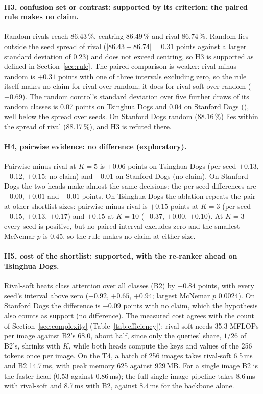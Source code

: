 \documentclass[11pt,a4paper]{article}
\theoremstyle{plain}
\newcommand{\fn}[1]{\texttt{\detokenize{#1}}}
\begin{document}
\paragraph{H3, confusion set or contrast: supported by its criterion; the paired rule makes no claim.}
Random rivals reach 86.43\,\%, centring 86.49\,\% and rival 86.74\,\%. Random lies outside the seed spread of rival
($|86.43-86.74|=0.31$ points against a larger standard deviation of 0.23) and does not exceed centring, so H3 is
supported as defined in Section~\ref{sec:rule}. The paired comparison is weaker: rival minus random is $+0.31$ points
with one of three intervals excluding zero, so the rule itself makes no claim for rival over random; it does for
rival-soft over random ($+0.69$). The random control's standard deviation over five further draws of its random
classes is 0.07 points on Tsinghua Dogs and 0.04 on Stanford Dogs (\fn{top1_draw_sd}), well below the spread over
seeds. On Stanford Dogs random (88.16\,\%) lies within the spread of rival (88.17\,\%), and H3 is refuted there.

\paragraph{H4, pairwise evidence: no difference (exploratory).}
Pairwise minus rival at $K=5$ is $+0.06$ points on Tsinghua Dogs (per seed $+0.13$, $-0.12$, $+0.15$; no claim) and
$+0.01$ on Stanford Dogs (no claim). On Stanford Dogs the two heads make almost the same decisions: the per-seed
differences are $+0.00$, $+0.01$ and $+0.01$ points. On Tsinghua Dogs the ablation repeats the pair at other
shortlist sizes: pairwise minus rival is $+0.15$ points at $K=3$ (per seed $+0.15$, $+0.13$, $+0.17$) and $+0.15$ at
$K=10$ ($+0.37$, $+0.00$, $+0.10$). At $K=3$ every seed is positive, but no paired interval excludes zero and the
smallest McNemar $p$ is 0.45, so the rule makes no claim at either size.

\paragraph{H5, cost of the shortlist: supported, with the re-ranker ahead on Tsinghua Dogs.}
Rival-soft beats class attention over all classes (B2) by $+0.84$ points, with every seed's interval above zero
($+0.92$, $+0.65$, $+0.94$; largest McNemar $p$ 0.0024). On Stanford Dogs the difference is $-0.09$ points with no
claim, which the hypothesis also counts as support (no difference). The measured cost agrees with the count of
Section~\ref{sec:complexity} (Table~\ref{tab:efficiency}): rival-soft needs 35.3 MFLOPs per image against B2's 68.0,
about half, since only the queries' share, $1/26$ of B2's, shrinks with $K$, while both heads compute the keys and
values of the 256 tokens once per image. On the T4, a batch of 256 images takes rival-soft 6.5\,ms and B2 14.7\,ms,
with peak memory 625 against 929\,MB. For a single image B2 is the faster head (0.53 against 0.86\,ms); the full
single-image pipeline takes 8.6\,ms with rival-soft and 8.7\,ms with B2, against 8.4\,ms for the backbone alone.
\end{document}
